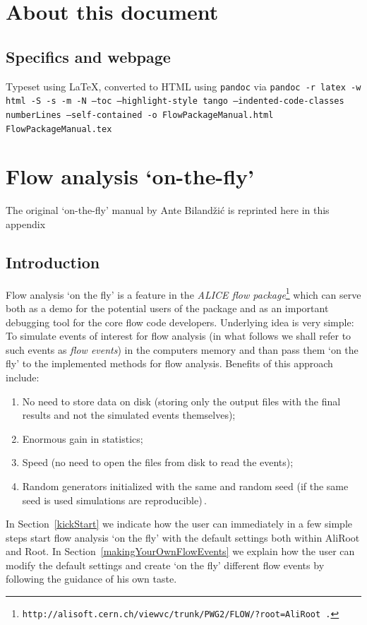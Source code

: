 \documentclass[a4paper]{book}
\numberwithin{equation}{subsection}
\begin{document}
\appendix		
	\chapter{About this document}
        \section{Specifics and webpage}
        Typeset using \LaTeX, converted to HTML using \texttt{pandoc} via \texttt{pandoc -r latex -w html -S -s -m -N --toc --highlight-style tango --indented-code-classes numberLines --self-contained -o FlowPackageManual.html FlowPackageManual.tex}
        
        \chapter{Flow analysis `on-the-fly'}\label{sec:ante}
        	The original `on-the-fly' manual by Ante Biland\v zi\'c is reprinted here in this appendix

        \section{Introduction}
Flow analysis `on the fly' is a feature in the \textit{ALICE flow package}\footnote{\texttt{http://alisoft.cern.ch/viewvc/trunk/PWG2/FLOW/?root=AliRoot .}} which can serve both as a demo for the potential users of the package and as an important debugging tool for the core flow code developers. Underlying idea is very simple: To simulate events of interest for flow analysis (in what follows we shall refer to such events as \textit{flow events}) in the computers memory and than pass them `on the fly' to the implemented methods for flow analysis. Benefits of this approach include: 
%
\begin{enumerate}
\item No need to store data on disk (storing only the output files with the final results and not the simulated events themselves);
\item Enormous gain in statistics; 
\item Speed (no need to open the files from disk to read the events);
\item Random generators initialized with the same and random seed (if the same seed is used simulations are reproducible)\,. 
\end{enumerate}
%
In Section~\ref{kickStart} we indicate how the user can immediately in a few simple steps start flow analysis `on the fly' with the default settings both within AliRoot and Root. In Section~\ref{makingYourOwnFlowEvents} we explain how the user can modify the default settings and create `on the fly' different flow events by following the guidance of his own taste. 
 
\end{document}
